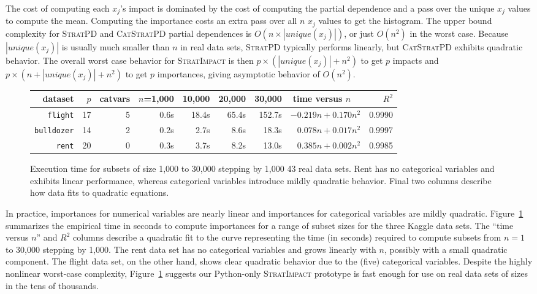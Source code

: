 \documentclass[11pt]{article}
\newcommand{\figref}[1]{Figure~\ref{#1}}
\newcommand{\simp}{\fontfamily{cmr}\textsc{\small StratImpact}}
\newcommand{\spd}{\fontfamily{cmr}\textsc{\small StratPD}}
\newcommand{\cspd}{\fontfamily{cmr}\textsc{\small CatStratPD}}
\begin{document}
The cost of computing each $x_j$'s impact is dominated by the cost of computing the partial dependence and a pass over the unique $x_j$ values to compute the mean. Computing the importance costs an extra pass over all $n$ $x_j$ values to get the histogram. The upper bound  complexity for \spd{} and \cspd{} partial dependences is $O(n \times |unique(x_j)|)$, or just $O(n^2)$ in the worst case.   Because $|unique(x_j)|$ is usually much smaller than $n$ in real data sets, \spd{} typically performs linearly, but \cspd{} exhibits quadratic behavior.  The overall worst case behavior for \simp{} is then $p \times (|unique(x_j)| + n^2)$ to get $p$ impacts and $p \times (n + |unique(x_j)| + n^2)$  to get $p$ importances, giving asymptotic behavior of $O(n^2)$.

\begin{figure}
\centering
\begin{tabular}{r r r r r r r r r}
{\bf dataset} & $p$ & catvars & {\small $n$=1,000} & {\small 10,000} & {\small 20,000} & {\small 30,000} & time versus $n$~~ & $R^2$\\
\hline
{\tt\small flight} & 17 & 5 & 0.6s & 18.4s & 65.4s & 152.7s & {\small $-0.219 n + 0.170 n^2$} & {\small 0.9990}\\
{\tt\small bulldozer} & 14 & 2 & 0.2s & 2.7s & 8.6s & 18.3s & {\small $0.078 n + 0.017 n^2$} & {\small 0.9997}\\
{\tt\small rent} & 20 & 0 & 0.3s & 3.7s & 8.2s & 13.0s & {\small $0.385 n + 0.002 n^2$} & {\small 0.9985}\\
\end{tabular}
\caption{\small  Execution time for subsets of size 1,000 to 30,000 stepping by 1,000 43 real data sets. Rent has no categorical variables and exhibits linear performance, whereas categorical variables introduce mildly quadratic behavior. Final two columns describe how data fits to quadratic equations.}
\label{fig:timing}
\end{figure}

In practice, importances for numerical variables are nearly linear and importances for categorical variables are mildly quadratic. \figref{fig:timing} summarizes the empirical time in seconds to compute importances for a range of subset sizes for the three Kaggle data sets. The ``time versus $n$'' and $R^2$ columns describe a quadratic fit to the curve representing the time (in seconds) required to compute subsets from $n=1$ to 30,000 stepping by 1,000. The rent data set has no categorical variables and grows linearly with $n$, possibly with a small quadratic component. The flight data set, on the other hand, shows clear quadratic behavior due to the (five) categorical variables. Despite the highly nonlinear worst-case complexity, \figref{fig:timing} suggests our Python-only \simp{} prototype is fast enough for use on real data sets of sizes in the tens of thousands. 
\end{document}
